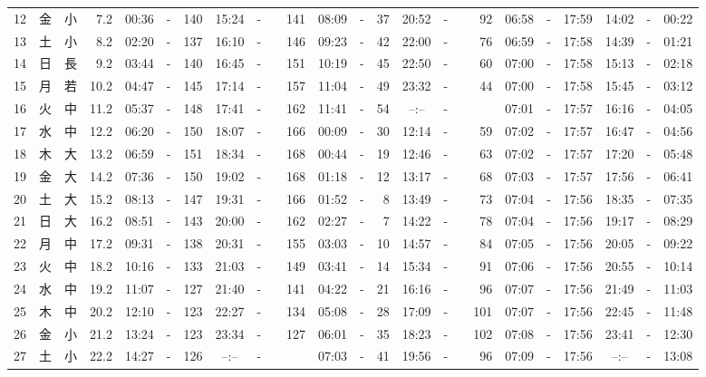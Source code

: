 \documentclass[12pt,a4j]{jsarticle}
\begin{document}
\begin{table}[htbp]
\begin{center}
{\begin{tabular}{|rc|cr|ccrccr|ccrccr|ccc|ccc|}
12 & 金 & 小 &  7.2 &  00:36 &-& 140 &  15:24 &-& 141 &  08:09 &-&  37 &  20:52 &-&  92 & 06:58 & -& 17:59 & 14:02 & -& 00:22 \\
13 & 土 & 小 &  8.2 &  02:20 &-& 137 &  16:10 &-& 146 &  09:23 &-&  42 &  22:00 &-&  76 & 06:59 & -& 17:58 & 14:39 & -& 01:21 \\
14 & 日 & 長 &  9.2 &  03:44 &-& 140 &  16:45 &-& 151 &  10:19 &-&  45 &  22:50 &-&  60 & 07:00 & -& 17:58 & 15:13 & -& 02:18 \\
15 & 月 & 若 & 10.2 &  04:47 &-& 145 &  17:14 &-& 157 &  11:04 &-&  49 &  23:32 &-&  44 & 07:00 & -& 17:58 & 15:45 & -& 03:12 \\
16 & 火 & 中 & 11.2 &  05:37 &-& 148 &  17:41 &-& 162 &  11:41 &-&  54 &  --:-- &-&~~~~~ & 07:01 & -& 17:57 & 16:16 & -& 04:05 \\
17 & 水 & 中 & 12.2 &  06:20 &-& 150 &  18:07 &-& 166 &  00:09 &-&  30 &  12:14 &-&  59 & 07:02 & -& 17:57 & 16:47 & -& 04:56 \\
18 & 木 & 大 & 13.2 &  06:59 &-& 151 &  18:34 &-& 168 &  00:44 &-&  19 &  12:46 &-&  63 & 07:02 & -& 17:57 & 17:20 & -& 05:48 \\
19 & 金 & 大 & 14.2 &  07:36 &-& 150 &  19:02 &-& 168 &  01:18 &-&  12 &  13:17 &-&  68 & 07:03 & -& 17:57 & 17:56 & -& 06:41 \\
20 & 土 & 大 & 15.2 &  08:13 &-& 147 &  19:31 &-& 166 &  01:52 &-&   8 &  13:49 &-&  73 & 07:04 & -& 17:56 & 18:35 & -& 07:35 \\
21 & 日 & 大 & 16.2 &  08:51 &-& 143 &  20:00 &-& 162 &  02:27 &-&   7 &  14:22 &-&  78 & 07:04 & -& 17:56 & 19:17 & -& 08:29 \\
22 & 月 & 中 & 17.2 &  09:31 &-& 138 &  20:31 &-& 155 &  03:03 &-&  10 &  14:57 &-&  84 & 07:05 & -& 17:56 & 20:05 & -& 09:22 \\
23 & 火 & 中 & 18.2 &  10:16 &-& 133 &  21:03 &-& 149 &  03:41 &-&  14 &  15:34 &-&  91 & 07:06 & -& 17:56 & 20:55 & -& 10:14 \\
24 & 水 & 中 & 19.2 &  11:07 &-& 127 &  21:40 &-& 141 &  04:22 &-&  21 &  16:16 &-&  96 & 07:07 & -& 17:56 & 21:49 & -& 11:03 \\
25 & 木 & 中 & 20.2 &  12:10 &-& 123 &  22:27 &-& 134 &  05:08 &-&  28 &  17:09 &-& 101 & 07:07 & -& 17:56 & 22:45 & -& 11:48 \\
26 & 金 & 小 & 21.2 &  13:24 &-& 123 &  23:34 &-& 127 &  06:01 &-&  35 &  18:23 &-& 102 & 07:08 & -& 17:56 & 23:41 & -& 12:30 \\
27 & 土 & 小 & 22.2 &  14:27 &-& 126 &  --:-- &-&~~~~~ &  07:03 &-&  41 &  19:56 &-&  96 & 07:09 & -& 17:56 & --:-- & -& 13:08 \\

\end{tabular}}
\end{center}
\end{table}
\end{document}
